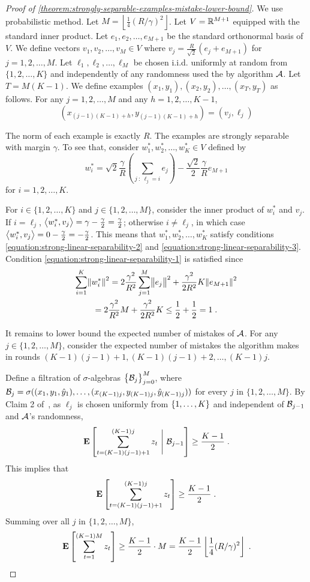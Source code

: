 \begin{proof}[Proof of \autoref{theorem:strongly-separable-examples-mistake-lower-bound}]
We use probabilistic method. Let $M = \left\lfloor \frac{1}{4} (R/\gamma)^2
\right\rfloor$. Let $V = \mathbb{R}^{M+1}$ equipped with the standard inner product.
Let $e_1, e_2, \dots, e_{M+1}$ be the standard orthonormal basis of $V$. We
define vectors $v_1, v_2, \dots, v_M \in V$ where $v_j = \frac{R}{\sqrt{2}}(e_j
+ e_{M+1})$ for $j=1,2,\dots,M$. Let $\ell_1, \ell_2, \dots, \ell_M$ be chosen
i.i.d. uniformly at random from $\{1,2,\dots,K\}$ and independently of any
randomness used the by algorithm $\mathcal{A}$. Let $T = M (K - 1)$. We define examples $(x_1,
y_1), (x_2, y_2), \dots, (x_T, y_T)$ as follows. For any $j=1,2,\dots,M$ and any
$h=1,2,\dots,K-1$,
$$
(x_{(j-1)(K-1) + h}, y_{(j-1)(K-1) + h}) = (v_j, \ell_j)
$$

The norm of each example is exactly $R$. The examples are strongly separable
with margin $\gamma$. To see that, consider $w_1^*, w_2^*, \dots, w_K^* \in V$
defined by
$$
w_i^* = \sqrt{2} \frac{\gamma}{R} \left( \sum_{j ~:~ \ell_j = i} e_j \right) - \frac{\sqrt{2}}2 \frac{\gamma}{R} e_{M+1}
$$
for $i=1,2,\dots,K$.

For $i \in \{1,2,\dots,K\}$ and $j \in
\{1,2,\dots,M\}$, consider the inner product of $w_i^*$ and $v_j$.
If $i = \ell_j$, $\left\langle w_i^*, v_j \right\rangle = \gamma - \frac \gamma 2 = \frac \gamma 2$;
otherwise $i \neq \ell_j$, in which case
$\left\langle w_i^*, v_j \right\rangle = 0 - \frac \gamma 2 = - \frac \gamma 2$.
This means that $w_1^*, w_2^*, \dots, w_K^*$ satisfy
conditions
\eqref{equation:strong-linear-separability-2} and
\eqref{equation:strong-linear-separability-3}. Condition \eqref{equation:strong-linear-separability-1}
is satisfied since
\begin{multline*}
\sum_{i=1}^K \norm{w_i^*}^2
= 2 \frac{\gamma^2}{R^2} \sum_{j=1}^M \norm{e_j}^2 +  \frac{\gamma^2}{2 R^2} K \norm{e_{M+1}}^2 \\
= 2 \frac{\gamma^2}{R^2} M + \frac{\gamma^2}{2 R^2} K
\le \frac{1}{2} + \frac{1}{2}
= 1 \; .
\end{multline*}

It remains to lower bound the expected number of mistakes of $\mathcal{A}$. For
any $j \in \{1,2,\dots,M\}$, consider the expected number of mistakes the
algorithm makes in rounds $(K-1)(j-1) + 1, (K-1)(j-1) + 2, \dots, (K-1)j$.

Define a filtration of $\sigma$-algebras $\cbr{\calB_j}_{j=0}^M$, where $\mathcal{B}_j
= \sigma((x_1, y_1, \hat{y}_1), \ldots, (x_{(K-1)j}, y_{(K-1)j},
\hat{y}_{(K-1)j}))$ for every $j$ in $\{1,2,\dots,M\}$. By Claim 2
of~\citet{Daniely-Helbertal-2013}, as $\ell_j$ is chosen uniformly from
$\cbr{1,\dots,K}$ and independent of $\mathcal{B}_{j-1}$ and $\mathcal{A}$'s randomness,
$$
\Exp \sbr{ \sum_{t=(K-1)(j-1) + 1}^{(K-1)j} z_t ~\Bigg|~ \calB_{j-1} } \ge \frac{K-1}{2} \; .
$$
This implies that
$$
\Exp \sbr{ \sum_{t=(K-1)(j-1) + 1}^{(K-1)j} z_t } \ge \frac{K-1}{2} \; .
$$
Summing over all $j$ in $\{1,2,\dots,M\}$,
$$
\Exp \sbr{ \sum_{t=1}^{(K-1)M} z_t} \geq \frac{K-1}2 \cdot M = \frac{K-1}2 \left\lfloor \frac 1 4 (R/\gamma)^2 \right\rfloor \; .
$$


\end{proof}

